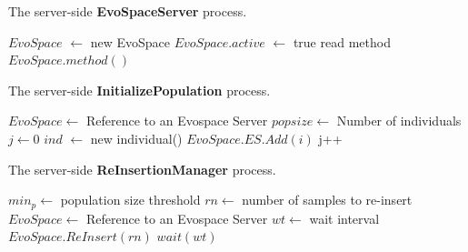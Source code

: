 \begin{algorithm}[t]
\caption{The server-side \textbf{EvoSpaceServer} process.}
\begin{algorithmic}
\STATE $EvoSpace$ $\leftarrow$ new EvoSpace
\STATE $EvoSpace.active$ $\leftarrow$ true
\STATE read method
\RETURN $EvoSpace.method()$
\ENDWHILE
\end{algorithmic}
\label{alg:evoserver}
\end{algorithm}


\begin{algorithm}[t]
\caption{The server-side \textbf{InitializePopulation} process.}
\begin{algorithmic}
\REQUIRE $EvoSpace \leftarrow$ Reference to an Evospace Server
\REQUIRE $popsize \leftarrow$ Number of individuals
\STATE $j \leftarrow 0$
\STATE $ind$ $\leftarrow$ new individual() 
\STATE $EvoSpace.ES.Add(i)$
\STATE j++
\ENDFOR
\end{algorithmic}
\label{alg:population}
\end{algorithm}

\begin{algorithm}[t]
\caption{The server-side \textbf{ReInsertionManager} process.}
\begin{algorithmic}
\REQUIRE $min_p \leftarrow$ population size threshold
\REQUIRE $rn \leftarrow$ number of samples to re-insert
\REQUIRE $EvoSpace \leftarrow$ Reference to an Evospace Server
\REQUIRE $wt \leftarrow$ wait interval
\STATE $EvoSpace.ReInsert(rn)$
\ENDIF
\STATE $wait(wt)$
\ENDWHILE
\end{algorithmic}
\label{alg:remanager}
\end{algorithm}


